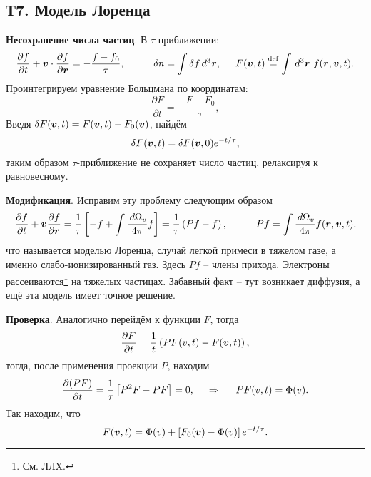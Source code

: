 \subsection*{Т7. Модель Лоренца}

\textbf{Несохранение числа частиц}. 
В $\tau$-приближении:
\begin{equation*}
	\frac{\partial f}{\partial t}  + \vc{v} \cdot \frac{\partial f}{\partial \vc{r}} = - \frac{f-f_0}{\tau},
	\hspace{10 mm} 
	\delta n = \int \delta f \d^3 \vc{r},
	\hspace{5 mm} 
	F(\vc{v}, t) \overset{\mathrm{def}}{=} \int \d^3 \vc{r}\ f(\vc{r}, \vc{v}, t).
\end{equation*}
Проинтегрируем уравнение Больцмана по координатам:
\begin{equation*}
	\frac{\partial F}{\partial t} = - \frac{F-F_0}{\tau},
\end{equation*}
Введя $\delta F (\boldsymbol{v}, t) = F(\boldsymbol{v}, t) - F_0 (\boldsymbol{v})$, найдём
\begin{equation*}
	\delta F(\boldsymbol{v}, t) = \delta F(\boldsymbol{v}, 0) e^{- t/\tau},
\end{equation*}
таким образом $\tau$-приближение не сохраняет число частиц, релаксируя к равновесному. 


\textbf{Модификация}. Исправим эту проблему следующим образом
\begin{equation*}
	\frac{\partial f}{\partial t} + \vc{v} \frac{\partial f}{\partial \vc{r}}  = \frac{1}{\tau} \left[
		- f + \int \frac{\d \Omega_v}{4\pi} f
	\right] = \frac{1}{\tau} \left(Pf - f\right),
	\hspace{10 mm} 
	P f = \int \frac{\d \Omega_v}{4\pi} f(\vc{r}, \vc{v}, t).
\end{equation*}
что называется моделью Лоренца, случай легкой примеси в тяжелом газе, а именно слабо-ионизированный газ. Здесь $Pf$ -- члены прихода.  Электроны рассеиваются\footnote{
	См. ЛЛX.
}  на тяжелых частицах.
Забавный факт -- тут возникает диффузия, а ещё эта модель имеет точное решение. 


\textbf{Проверка}. Аналогично перейдём к функции $F$, тогда
\begin{equation*}
	\frac{\partial F}{\partial t} = \frac{1}{t}\left(
		P F(v, t) - F(\boldsymbol{v}, t)
	\right),
\end{equation*}
тогда, после применения проекции $P$, находим
\begin{equation*}
	\frac{\partial (PF)}{\partial t}  = \frac{1}{\tau}\left[P^2 F - P F\right] = 0,
	\hspace{0.5cm} \Rightarrow \hspace{0.5cm}
	PF(v, t) = \Phi(v).
\end{equation*}
Так находим, что
\begin{equation*}
	F(\boldsymbol{v}, t) = \Phi(v) + \left[
		F_0 (\boldsymbol{v}) - \Phi(v)
	\right] e^{- t/\tau}.
\end{equation*}



